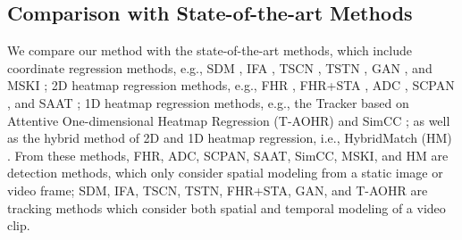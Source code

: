 \documentclass[review]{elsarticle}
\begin{document}
\subsection{Comparison with State-of-the-art Methods}
\label{cp}
We compare our method with the state-of-the-art methods, which include coordinate regression methods, e.g., SDM \cite{SDM}, IFA \cite{IFA},  TSCN \cite{TSCN},  TSTN \cite{TSTN},  GAN \cite{GAN_Tracking}, and MSKI \cite{MSKI}; 2D heatmap regression methods, e.g., FHR \cite{tai2018towards}, FHR+STA \cite{tai2018towards}, ADC \cite{ADC}, SCPAN \cite{SCPAN}, and SAAT \cite{SAAT}; 1D heatmap regression methods, e.g., the Tracker based on Attentive One-dimensional Heatmap Regression (T-AOHR) \cite{AOHR} and SimCC \cite{SimCC}; as well as the hybrid method of 2D and 1D heatmap regression, i.e., HybridMatch (HM) \cite{HybridMatch}. From these methods, FHR, ADC, SCPAN, SAAT, SimCC, MSKI, and HM are detection methods, which only consider spatial modeling from a static image or video frame; SDM, IFA, TSCN, TSTN, FHR+STA, GAN, and T-AOHR are tracking methods which consider both spatial and temporal modeling of a video clip.
\end{document}
